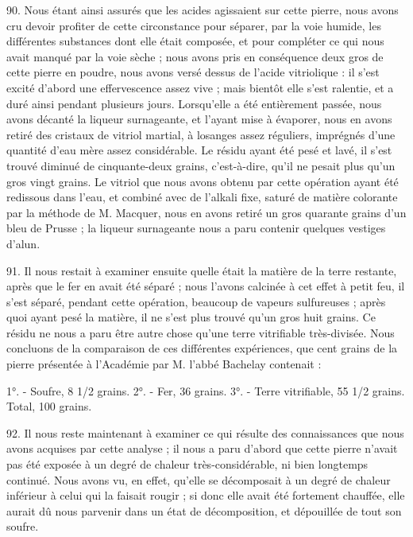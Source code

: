 \documentclass[a4paper, 11pt, oneside, polutonikogreek, french]{article}
\begin{document}
90. Nous étant ainsi assurés que les acides agissaient sur cette pierre, nous avons cru devoir profiter de cette circonstance pour séparer, par la voie humide, les différentes substances dont elle était composée, et pour compléter ce qui nous avait manqué par la voie sèche ; nous avons pris en conséquence deux gros de cette pierre en poudre, nous avons versé dessus de l'acide vitriolique : il s'est excité d'abord une effervescence assez vive ; mais bientôt elle s'est ralentie, et a duré ainsi pendant plusieurs jours. Lorsqu'elle a été entièrement passée, nous avons décanté la liqueur surnageante, et l'ayant mise à évaporer, nous en avons retiré des cristaux de vitriol martial, à losanges assez réguliers, imprégnés d'une quantité d'eau mère assez considérable. Le résidu ayant été pesé et lavé, il s'est trouvé diminué de cinquante-deux grains, c'est-à-dire, qu'il ne pesait plus qu'un gros vingt grains. Le vitriol que nous avons obtenu par cette opération ayant été redissous dans l'eau, et combiné avec de l'alkali fixe, saturé de matière colorante par la méthode de M. Macquer, nous en avons retiré un gros quarante grains d'un bleu de Prusse ; la liqueur surnageante nous a paru contenir quelques vestiges d'alun.

91. Il nous restait à examiner ensuite quelle était la matière de la terre restante, après que le fer en avait été séparé ; nous l'avons calcinée à cet effet à petit feu, il s'est séparé, pendant cette opération, beaucoup de vapeurs sulfureuses ; après quoi ayant pesé la matière, il ne s'est plus trouvé qu'un gros huit grains. Ce résidu ne nous a paru être autre chose qu'une terre vitrifiable très-divisée. Nous concluons de la comparaison de ces différentes expériences, que cent grains de la pierre présentée à l'Académie par M. l'abbé Bachelay contenait :

1°. - Soufre, 8 1/2 grains.
2°. - Fer, 36 grains.
3°. - Terre vitrifiable, 55 1/2 grains.
Total, 100 grains.

92. Il nous reste maintenant à examiner ce qui résulte des connaissances que nous avons acquises par cette analyse ; il nous a paru d'abord que cette pierre n'avait pas été exposée à un degré de chaleur très-considérable, ni bien longtemps continué. Nous avons vu, en effet, qu'elle se décomposait à un degré de chaleur inférieur à celui qui la faisait rougir ; si donc elle avait été fortement chauffée, elle aurait dû nous parvenir dans un état de décomposition, et dépouillée de tout son soufre.
\end{document}
